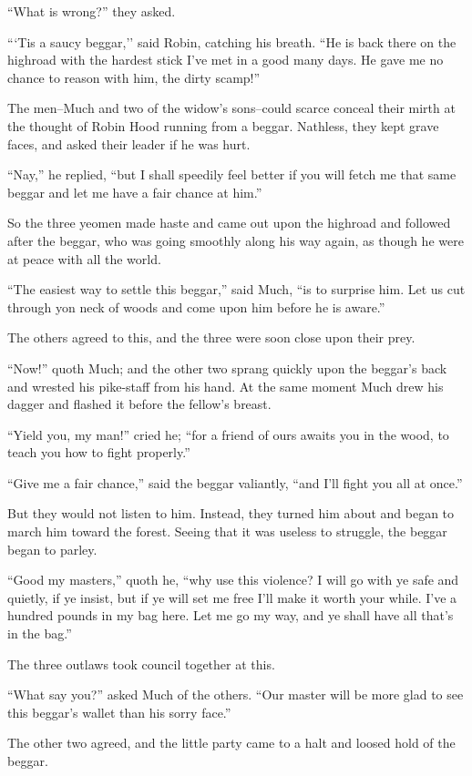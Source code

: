 ``What is wrong?'' they asked.

```Tis a saucy beggar,'' said Robin, catching his breath. ``He is back
there on the highroad with the hardest stick I've met in a good many
days. He gave me no chance to reason with him, the dirty scamp!''

The men--Much and two of the widow's sons--could scarce conceal their
mirth at the thought of Robin Hood running from a beggar. Nathless, they
kept grave faces, and asked their leader if he was hurt.

``Nay,'' he replied, ``but I shall speedily feel better if you will
fetch me that same beggar and let me have a fair chance at him.''

So the three yeomen made haste and came out upon the highroad and
followed after the beggar, who was going smoothly along his way again,
as though he were at peace with all the world.

``The easiest way to settle this beggar,'' said Much, ``is to surprise
him. Let us cut through yon neck of woods and come upon him before he is
aware.''

The others agreed to this, and the three were soon close upon their
prey.

``Now!'' quoth Much; and the other two sprang quickly upon the beggar's
back and wrested his pike-staff from his hand. At the same moment Much
drew his dagger and flashed it before the fellow's breast.

``Yield you, my man!'' cried he; ``for a friend of ours awaits you in
the wood, to teach you how to fight properly.''

``Give me a fair chance,'' said the beggar valiantly, ``and I'll fight
you all at once.''

But they would not listen to him. Instead, they turned him about and
began to march him toward the forest. Seeing that it was useless to
struggle, the beggar began to parley.

``Good my masters,'' quoth he, ``why use this violence? I will go with
ye safe and quietly, if ye insist, but if ye will set me free I'll make
it worth your while. I've a hundred pounds in my bag here. Let me go my
way, and ye shall have all that's in the bag.''

The three outlaws took council together at this.

``What say you?'' asked Much of the others. ``Our master will be more
glad to see this beggar's wallet than his sorry face.''

The other two agreed, and the little party came to a halt and loosed
hold of the beggar.

